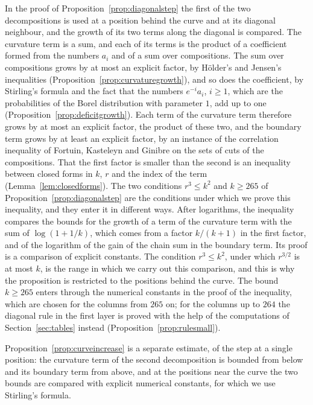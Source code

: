 \documentclass{amsart}
\theoremstyle{definition}
\theoremstyle{remark}
\numberwithin{equation}{section}
\begin{document}
In the proof of Proposition~\ref{prop:diagonalstep} the first of the two
decompositions is used at a
position behind the curve and at its diagonal neighbour, and the growth of
its two terms along the diagonal is compared. The curvature term is a sum,
and each of its terms is the product of a coefficient formed from the
numbers $a_i$ and of a sum over compositions. The sum over compositions
grows by at most an explicit factor, by H\"older's and Jensen's
inequalities (Proposition~\ref{prop:curvaturegrowth}), and so does the
coefficient, by Stirling's formula and the fact that the numbers
$e^{-i}a_i$, $i\ge1$, which are the probabilities of the Borel distribution
with parameter $1$, add up to one (Proposition~\ref{prop:deficitgrowth}).
Each term of the curvature term therefore grows by at most an explicit
factor, the product of these two, and the boundary term grows by at least
an explicit
factor, by an instance of the correlation inequality of Fortuin, Kasteleyn
and Ginibre \cite[Proposition~1]{fortuin1971} on the sets of cuts of the
compositions. That the first factor is smaller than the second is an
inequality between closed forms in $k$, $r$ and the index of the term
(Lemma~\ref{lem:closedforms}). The two conditions $r^3\le k^2$ and
$k\ge265$ of Proposition~\ref{prop:diagonalstep} are the conditions under
which we prove this inequality, and they enter it in different ways. After
logarithms, the inequality compares the bounds for the growth of a term of
the curvature term with the sum of $\log(1+1/k)$, which comes from a factor
$k/(k+1)$ in the first factor, and of the logarithm of the gain of the chain
sum in the boundary term. Its proof is a comparison of explicit constants.
The condition $r^3\le k^2$, under which $r^{3/2}$ is at most
$k$, is the range in which we carry out this comparison, and this is why
the proposition is restricted to the positions behind the curve. The bound
$k\ge265$ enters through the numerical constants in the proof of the
inequality, which are chosen for the columns from $265$ on; for the columns
up to $264$ the diagonal rule in the first layer is proved with the help of
the computations of Section~\ref{sec:tables} instead
(Proposition~\ref{prop:rulesmall}).

Proposition~\ref{prop:curveincrease} is a separate estimate, of the step at
a single position: the curvature term of the second decomposition is
bounded from
below and its boundary
term from above, and at the positions near the curve the two bounds are
compared with explicit numerical constants, for which we use Stirling's
formula.
\end{document}
